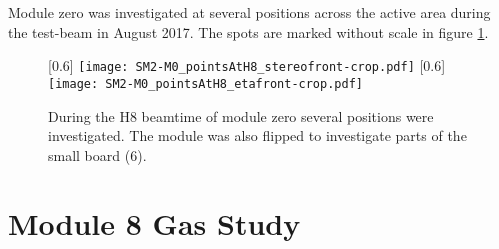 \documentclass[
twoside,            %
BCOR1.4cm,          %
10pt,               %
headings=normal,    %
headsepline,        %
clearplainpage,		%
final,              %
div=14,
open=right,
bibliography=toc
]{scrreprt}
\begin{document}
Module zero was investigated at several positions across the active area during the test-beam in August 2017.
The spots are marked without scale in figure \ref{H8M0positions}.

\begin{figure}[!h]
	\centering
	[0.6\textwidth]
	{\texttt{[image: SM2-M0\_pointsAtH8\_stereofront-crop.pdf]}}
	\hfill
	[0.6\textwidth]
	{\texttt{[image: SM2-M0\_pointsAtH8\_etafront-crop.pdf]}}
	\vspace{-2mm}
	\caption{
		During the H8 beamtime of module zero several positions were investigated.
		The module was also flipped to investigate parts of the small board (6). 
	}
	\label{H8M0positions}
\end{figure}

\newpage

\section{Module 8 Gas Study}
\end{document}
